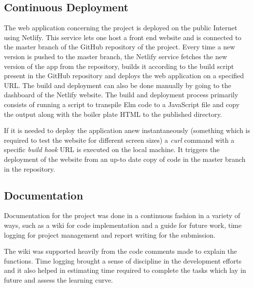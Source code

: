 \subsection{Continuous Deployment}
The web application concerning the project is deployed on the public Internet 
using Netlify. This service lets one host a front end website and is
connected to the master branch of the GitHub repository of the project. Every
time a new version is pushed to the master branch, the Netlify service fetches the new
version of the app from the repository, builds it according to the build script
present in the GitHub repository and deploys the web application on a specified
URL. The build and deployment can also be done manually by going to the
dashboard of the Netlify website. The build and deployment process primarily
consists of running a script to transpile Elm code to a JavaScript file and copy
the output along with the boiler plate HTML to the published directory.

If it is needed to deploy the application anew instantaneously (something which
is required to test the website for different screen sizes) a \emph{curl}
command with a specific \emph{build hook} URL is executed on the local
machine.  It triggers the deployment of the website from an up-to date copy of code in the master branch in the
repository.


\subsection{Documentation}
Documentation for the project was done in a continuous fashion in a variety of
ways, such as a wiki for code implementation and a guide for future work, time
logging for project management and report writing for the submission. 

The wiki was supported heavily from the code comments made to explain the
functions. Time logging brought a sense of discipline in the development efforts and
it also helped in estimating time required to complete the tasks which lay in
future and assess the learning curve.
